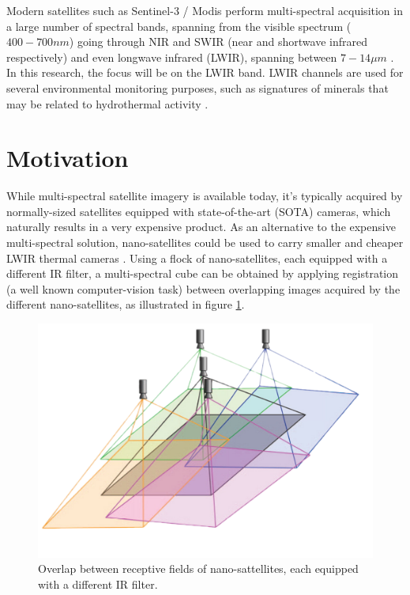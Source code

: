 Modern satellites such as Sentinel-3 / Modis perform multi-spectral acquisition in a large number of spectral bands, spanning from the visible spectrum ($400-700nm$) going through NIR and SWIR (near and shortwave infrared respectively) and even longwave infrared (LWIR), spanning between $7-14\mu m$ \cite{ahmad2002p1}.
In this research, the focus will be on the LWIR band. 
LWIR channels are used for several environmental monitoring purposes, such as signatures of minerals that may be related to hydrothermal activity \cite{article_LWIR}.

\section{Motivation}
While multi-spectral satellite imagery is available today, it's typically acquired by normally-sized satellites equipped with state-of-the-art (SOTA) cameras, which naturally results in a very expensive product. 
As an alternative to the expensive multi-spectral solution, nano-satellites could be used to carry smaller and cheaper LWIR thermal cameras \cite{article}. 
Using a flock of nano-satellites, each equipped with a different IR filter, a multi-spectral cube can be obtained by applying registration (a well known computer-vision task) between overlapping images acquired by the different nano-satellites, as illustrated in figure \ref{fig:registration}.
\begin{figure}[H]
    \centering
    \includegraphics[width=\linewidth]{../figs/introduction/multicamera.png}
    \caption{Overlap between receptive fields of nano-sattellites, each equipped with a different IR filter.}
    \label{fig:registration}
\end{figure}

